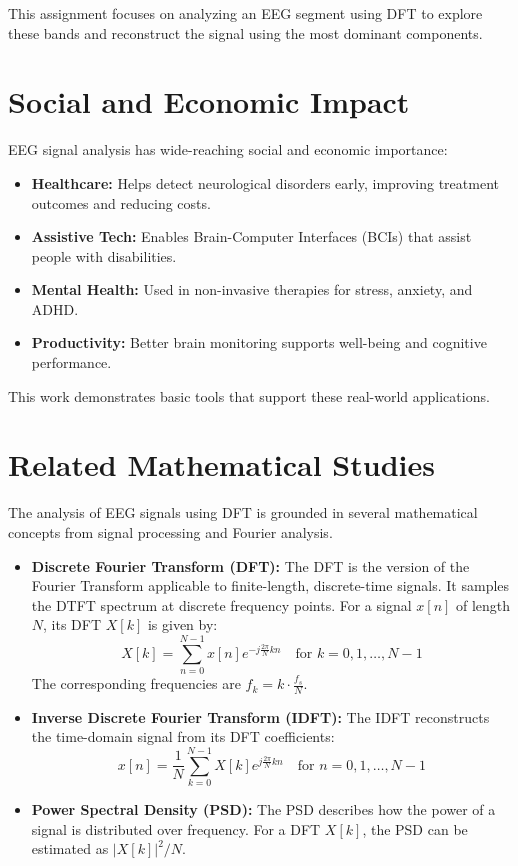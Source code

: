 \documentclass[12pt, a4paper]{article}
\begin{document}
This assignment focuses on analyzing an EEG segment using DFT to explore these bands and reconstruct the signal using the most dominant components.

\section{Social and Economic Impact}
\label{sec:social_economic_impact}
EEG signal analysis has wide-reaching social and economic importance:

\begin{itemize}
    \item \textbf{Healthcare:} Helps detect neurological disorders early, improving treatment outcomes and reducing costs.
    \item \textbf{Assistive Tech:} Enables Brain-Computer Interfaces (BCIs) that assist people with disabilities.
    \item \textbf{Mental Health:} Used in non-invasive therapies for stress, anxiety, and ADHD.
    \item \textbf{Productivity:} Better brain monitoring supports well-being and cognitive performance.
\end{itemize}

This work demonstrates basic tools that support these real-world applications.
\section{Related Mathematical Studies}
\label{sec:related_math_studies}
The analysis of EEG signals using DFT is grounded in several mathematical concepts from signal processing and Fourier analysis.
\begin{itemize}
 
    \item \textbf{Discrete Fourier Transform (DFT):} The DFT is the version of the Fourier Transform applicable to finite-length, discrete-time signals. It samples the DTFT spectrum at discrete frequency points. For a signal $x[n]$ of length $N$, its DFT $X[k]$ is given by:
    \begin{equation}
        X[k] = \sum_{n=0}^{N-1} x[n] e^{-j \frac{2\pi}{N} kn} \quad \text{for } k = 0, 1, \dots, N-1
    \end{equation}
    The corresponding frequencies are $f_k = k \cdot \frac{f_s}{N}$.

    \item \textbf{Inverse Discrete Fourier Transform (IDFT):} The IDFT reconstructs the time-domain signal from its DFT coefficients:
    \begin{equation}
        x[n] = \frac{1}{N} \sum_{k=0}^{N-1} X[k] e^{j \frac{2\pi}{N} kn} \quad \text{for } n = 0, 1, \dots, N-1
    \end{equation}

    \item \textbf{Power Spectral Density (PSD):} The PSD describes how the power of a signal is distributed over frequency. For a DFT $X[k]$, the PSD can be estimated as $|X[k]|^2/N$.
\end{itemize}
\end{document}
